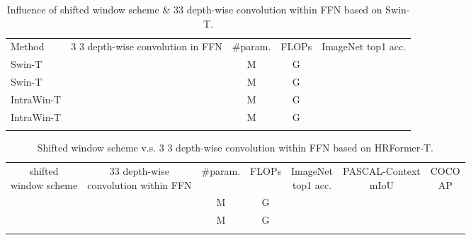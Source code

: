 \documentclass{article}
\newcommand{\cmark}{\ding{51}}\newcommand{\xmark}{\ding{55}}\newcolumntype{Y}{>{\centering\arraybackslash}X}
\begin{document}
\renewcommand{\arraystretch}{1.2}
\begin{table}[h]
  \footnotesize
  \begin{center}
    \setlength{\tabcolsep}{9pt}
    \centering
    \caption{\label{tab:comp_swin}Influence of shifted window scheme \& 33 depth-wise convolution within FFN based on Swin-T.}
    \begin{tabular}{l|c|c|c|c}
      \shline
      Method     & 3 3 depth-wise convolution in FFN & \#param. & FLOPs  & ImageNet top1 acc. \\
      \shline
      Swin-T     & \xmark                                    & M  & G &              \\
      Swin-T     & \cmark                                    & M  & G &              \\ \hline
      IntraWin-T & \xmark                                    & M  & G &              \\
      IntraWin-T & \cmark                                    & M  & G &              \\
      \shline
    \end{tabular}
  \end{center}
\end{table}



\renewcommand{\arraystretch}{1.2}
\begin{table}[h]
  \footnotesize
  \begin{center}
    \setlength{\tabcolsep}{6pt}
    \centering
    \caption{\label{tab:comp_small_hrnet}Shifted window scheme v.s.
      3 3 depth-wise convolution within FFN based on HRFormer-T.}
    \resizebox{1\linewidth}{!}
    {
      \begin{tabular}{c|c|c|c|ccc}
        \shline
        \thead{shifted                                               \\window scheme} & \thead{33 depth-wise\\convolution within FFN} & \#param. & FLOPs & \thead{ImageNet \\top1 acc.} & \thead{PASCAL-Context\\mIoU} & \thead{COCO\\AP}  \\
        \shline
        \xmark & \cmark & M & G &  &  &  \\
        \cmark & \xmark & M & G &  &  &  \\
        \shline
      \end{tabular}
    }
  \end{center}
\end{table}
\end{document}
